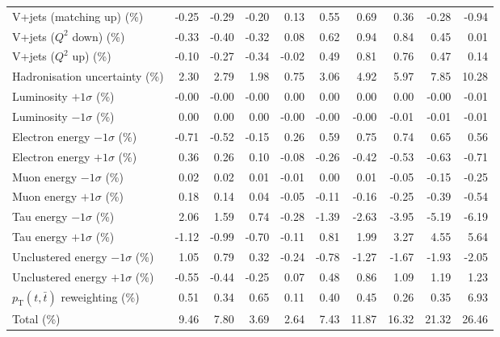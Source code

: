 \begin{table}[htbp]
{\begin{tabular}{lrrrrrrrrr}
V+jets (matching up) (\%) & -0.25 & -0.29 & -0.20 & 0.13 & 0.55 & 0.69 & 0.36 & -0.28 & -0.94 \\ 
V+jets ($Q^{2}$ down) (\%) & -0.33 & -0.40 & -0.32 & 0.08 & 0.62 & 0.94 & 0.84 & 0.45 & 0.01 \\ 
V+jets ($Q^{2}$ up) (\%) & -0.10 & -0.27 & -0.34 & -0.02 & 0.49 & 0.81 & 0.76 & 0.47 & 0.14 \\ 
Hadronisation uncertainty (\%) & 2.30 & 2.79 & 1.98 & 0.75 & 3.06 & 4.92 & 5.97 & 7.85 & 10.28 \\ 
Luminosity $+1\sigma$ (\%) & -0.00 & -0.00 & -0.00 & 0.00 & 0.00 & 0.00 & 0.00 & -0.00 & -0.01 \\ 
Luminosity $-1\sigma$ (\%) & 0.00 & 0.00 & 0.00 & -0.00 & -0.00 & -0.00 & -0.01 & -0.01 & -0.01 \\ 
Electron energy $-1\sigma$ (\%) & -0.71 & -0.52 & -0.15 & 0.26 & 0.59 & 0.75 & 0.74 & 0.65 & 0.56 \\ 
Electron energy $+1\sigma$ (\%) & 0.36 & 0.26 & 0.10 & -0.08 & -0.26 & -0.42 & -0.53 & -0.63 & -0.71 \\ 
Muon energy $-1\sigma$ (\%) & 0.02 & 0.02 & 0.01 & -0.01 & 0.00 & 0.01 & -0.05 & -0.15 & -0.25 \\ 
Muon energy $+1\sigma$ (\%) & 0.18 & 0.14 & 0.04 & -0.05 & -0.11 & -0.16 & -0.25 & -0.39 & -0.54 \\ 
Tau energy $-1\sigma$ (\%) & 2.06 & 1.59 & 0.74 & -0.28 & -1.39 & -2.63 & -3.95 & -5.19 & -6.19 \\ 
Tau energy $+1\sigma$ (\%) & -1.12 & -0.99 & -0.70 & -0.11 & 0.81 & 1.99 & 3.27 & 4.55 & 5.64 \\ 
Unclustered energy $-1\sigma$ (\%) & 1.05 & 0.79 & 0.32 & -0.24 & -0.78 & -1.27 & -1.67 & -1.93 & -2.05 \\ 
Unclustered energy $+1\sigma$ (\%) & -0.55 & -0.44 & -0.25 & 0.07 & 0.48 & 0.86 & 1.09 & 1.19 & 1.23 \\ 
$p_\mathrm{T}(t,\bar{t})$ reweighting (\%) & 0.51 & 0.34 & 0.65 & 0.11 & 0.40 & 0.45 & 0.26 & 0.35 & 6.93 \\ 
\hline 
Total (\%) & 9.46  & 7.80  & 3.69  & 2.64  & 7.43  & 11.87  & 16.32  & 21.32  & 26.46 \\ 
\hline 
\end{tabular}
}
\end{table}

